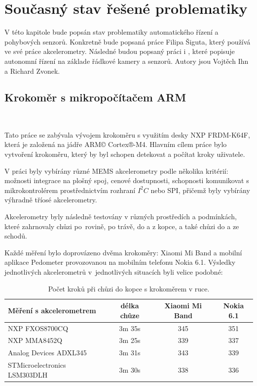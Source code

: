 \chapter{Současný stav řešené problematiky}
\label{sec:Theory}
\vspace{-20pt}

V této kapitole bude popsán stav problematiky automatického řízení a pohybových senzorů. Konkretně bude popsaná práce  Filipa Šiguta, který používá ve své práce akcelerometry. Následné budou popsaný práci  i , které popisuje autonomní řízení na základe řádkové kamery a senzorů. Autory jsou Vojtěch Ihn a Richard Zvonek.

\section{Krokoměr s mikropočítačem ARM}\

Tato práce se zabývala vývojem krokoměru s využitím desky NXP FRDM-K64F, která je založená na jádře ARM© Cortex®-M4. Hlavním cílem práce bylo vytvoření krokoměru, který by byl schopen detekovat a počítat kroky uživatele.

V práci byly vybírány různé MEMS akcelerometry podle několika kritérií: možnosti integrace na plošný spoj, cenové dostupnosti, schopnosti komunikovat s mikrokontrolérem prostřednictvím rozhraní $I^2C$ nebo SPI, přičemž byly vybírány výhradně tříosé akcelerometry.

Akcelerometry byly následně testovány v různých prostředích a podmínkách, které zahrnovaly chůzi po~rovině, po trávě, do a z kopce, a také chůzi do a ze schodů.

Každé měření bylo doprovázeno dvěma krokoměry:  Xiaomi Mi Band a mobilní aplikace Pedometer provozovanou na mobilním telefonu Nokia 6.1. Výsledky jednotlivých akcelerometrů v~jednotlivých situacích byli velice podobné:

\begin{table}[!htbp]
	\centering
	\begin{tabular}{lccc}
		\toprule
		Měření s akcelerometrem      & délka chůze & Xiaomi Mi Band & Nokia 6.1 \\
		\midrule
		NXP FXOS8700CQ               & 3m 35s      & 345            & 351       \\
		NXP MMA8452Q                 & 3m 25s      & 339            & 337       \\
		Analog Devices ADXL345       & 3m 31s      & 343            & 339       \\
		STMicroelectronics LSM303DLH & 3m 30s      & 338            & 336       \\
		\bottomrule
	\end{tabular}
	\caption{Počet kroků při chůzi do kopce s krokoměrem v ruce.}
	\label{tab:1}
	\vspace{-15pt}
\end{table}

